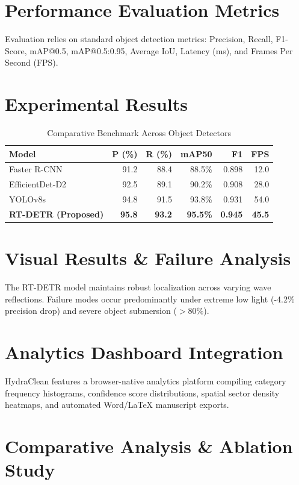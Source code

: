 \documentclass[10pt,journal,compsoc]{IEEEtran}
\begin{document}
\section{Performance Evaluation Metrics}
Evaluation relies on standard object detection metrics: Precision, Recall, F1-Score, mAP@0.5, mAP@0.5:0.95, Average IoU, Latency (ms), and Frames Per Second (FPS).

\section{Experimental Results}

\begin{table}[htbp]
\caption{Comparative Benchmark Across Object Detectors}
\centering
\begin{tabular}{lrrrrr}
\toprule
\textbf{Model} & \textbf{P (\%)} & \textbf{R (\%)} & \textbf{mAP50} & \textbf{F1} & \textbf{FPS} \\
\midrule
Faster R-CNN & 91.2 & 88.4 & 88.5\% & 0.898 & 12.0 \\
EfficientDet-D2 & 92.5 & 89.1 & 90.2\% & 0.908 & 28.0 \\
YOLOv8s & 94.8 & 91.5 & 93.8\% & 0.931 & 54.0 \\
\textbf{RT-DETR (Proposed)} & \textbf{95.8} & \textbf{93.2} & \textbf{95.5\%} & \textbf{0.945} & \textbf{45.5} \\
\bottomrule
\end{tabular}
\end{table}

\section{Visual Results \& Failure Analysis}
The RT-DETR model maintains robust localization across varying wave reflections. Failure modes occur predominantly under extreme low light (-4.2\% precision drop) and severe object submersion ($>80\%$).

\section{Analytics Dashboard Integration}
HydraClean features a browser-native analytics platform compiling category frequency histograms, confidence score distributions, spatial sector density heatmaps, and automated Word/LaTeX manuscript exports.

\section{Comparative Analysis \& Ablation Study}
\end{document}
